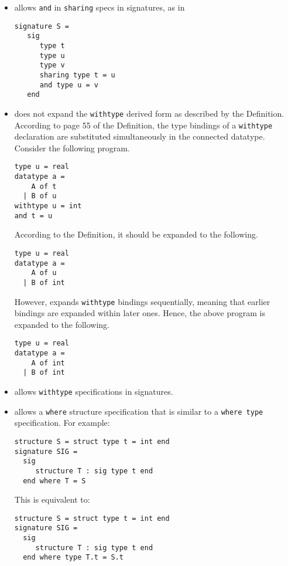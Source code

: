 \begin{itemize}
\item
{\smlnj} allows {\tt and} in {\tt sharing} specs in signatures, as in
\begin{verbatim}
signature S =
   sig
      type t
      type u
      type v
      sharing type t = u
      and type u = v
   end
\end{verbatim}

\item
{\smlnj} does not expand the {\tt withtype} derived form as described by
the Definition.  According to page 55 of the Definition, the type
bindings of a {\tt withtype} declaration are substituted simultaneously
in the connected datatype.  Consider the following program.
\begin{verbatim}
type u = real
datatype a =
    A of t
  | B of u
withtype u = int
and t = u
\end{verbatim}
According to the Definition, it should be expanded to the following.
\begin{verbatim}
type u = real
datatype a =
    A of u
  | B of int
\end{verbatim}
However, {\smlnj} expands {\tt withtype} bindings sequentially, meaning
that earlier bindings are expanded within later ones.  Hence, the
above program is expanded to the following.
\begin{verbatim}
type u = real
datatype a =
    A of int
  | B of int
\end{verbatim}

\item
{\smlnj} allows {\tt withtype} specifications in signatures.

\item
{\smlnj} allows a {\tt where} structure specification that is similar
to a {\tt where type} specification.  For example:
\begin{verbatim}
structure S = struct type t = int end
signature SIG =
  sig
     structure T : sig type t end
  end where T = S
\end{verbatim}
This is equivalent to:
\begin{verbatim}
structure S = struct type t = int end
signature SIG =
  sig
     structure T : sig type t end
  end where type T.t = S.t
\end{verbatim}

\end{itemize}
